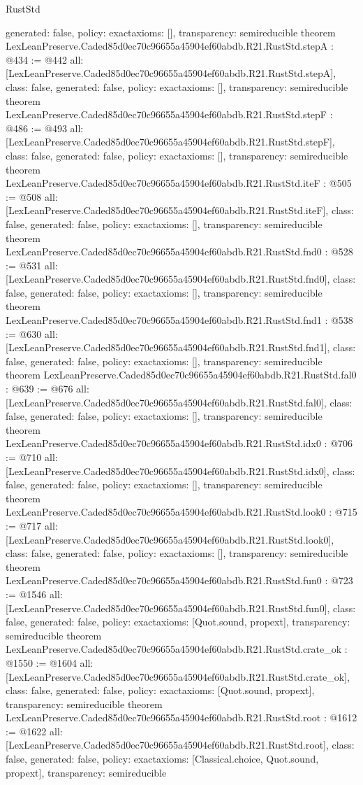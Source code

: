 \begin{lexlean}{RustStd}
\begin{coremodule}
{  generated: false,
  policy: exact{axioms: []},
  transparency: semireducible
}
theorem LexLeanPreserve.Caded85d0ec70c96655a45904ef60abdb.R21.RustStd.stepA : @434 := @442 {
  all: [LexLeanPreserve.Caded85d0ec70c96655a45904ef60abdb.R21.RustStd.stepA],
  class: false,
  generated: false,
  policy: exact{axioms: []},
  transparency: semireducible
}
theorem LexLeanPreserve.Caded85d0ec70c96655a45904ef60abdb.R21.RustStd.stepF : @486 := @493 {
  all: [LexLeanPreserve.Caded85d0ec70c96655a45904ef60abdb.R21.RustStd.stepF],
  class: false,
  generated: false,
  policy: exact{axioms: []},
  transparency: semireducible
}
theorem LexLeanPreserve.Caded85d0ec70c96655a45904ef60abdb.R21.RustStd.iteF : @505 := @508 {
  all: [LexLeanPreserve.Caded85d0ec70c96655a45904ef60abdb.R21.RustStd.iteF],
  class: false,
  generated: false,
  policy: exact{axioms: []},
  transparency: semireducible
}
theorem LexLeanPreserve.Caded85d0ec70c96655a45904ef60abdb.R21.RustStd.fnd0 : @528 := @531 {
  all: [LexLeanPreserve.Caded85d0ec70c96655a45904ef60abdb.R21.RustStd.fnd0],
  class: false,
  generated: false,
  policy: exact{axioms: []},
  transparency: semireducible
}
theorem LexLeanPreserve.Caded85d0ec70c96655a45904ef60abdb.R21.RustStd.fnd1 : @538 := @630 {
  all: [LexLeanPreserve.Caded85d0ec70c96655a45904ef60abdb.R21.RustStd.fnd1],
  class: false,
  generated: false,
  policy: exact{axioms: []},
  transparency: semireducible
}
theorem LexLeanPreserve.Caded85d0ec70c96655a45904ef60abdb.R21.RustStd.fal0 : @639 := @676 {
  all: [LexLeanPreserve.Caded85d0ec70c96655a45904ef60abdb.R21.RustStd.fal0],
  class: false,
  generated: false,
  policy: exact{axioms: []},
  transparency: semireducible
}
theorem LexLeanPreserve.Caded85d0ec70c96655a45904ef60abdb.R21.RustStd.idx0 : @706 := @710 {
  all: [LexLeanPreserve.Caded85d0ec70c96655a45904ef60abdb.R21.RustStd.idx0],
  class: false,
  generated: false,
  policy: exact{axioms: []},
  transparency: semireducible
}
theorem LexLeanPreserve.Caded85d0ec70c96655a45904ef60abdb.R21.RustStd.look0 : @715 := @717 {
  all: [LexLeanPreserve.Caded85d0ec70c96655a45904ef60abdb.R21.RustStd.look0],
  class: false,
  generated: false,
  policy: exact{axioms: []},
  transparency: semireducible
}
theorem LexLeanPreserve.Caded85d0ec70c96655a45904ef60abdb.R21.RustStd.fun0 : @723 := @1546 {
  all: [LexLeanPreserve.Caded85d0ec70c96655a45904ef60abdb.R21.RustStd.fun0],
  class: false,
  generated: false,
  policy: exact{axioms: [Quot.sound, propext]},
  transparency: semireducible
}
theorem LexLeanPreserve.Caded85d0ec70c96655a45904ef60abdb.R21.RustStd.crate_ok : @1550 := @1604 {
  all: [LexLeanPreserve.Caded85d0ec70c96655a45904ef60abdb.R21.RustStd.crate_ok],
  class: false,
  generated: false,
  policy: exact{axioms: [Quot.sound, propext]},
  transparency: semireducible
}
theorem LexLeanPreserve.Caded85d0ec70c96655a45904ef60abdb.R21.RustStd.root : @1612 := @1622 {
  all: [LexLeanPreserve.Caded85d0ec70c96655a45904ef60abdb.R21.RustStd.root],
  class: false,
  generated: false,
  policy: exact{axioms: [Classical.choice, Quot.sound, propext]},
  transparency: semireducible
}


\end{coremodule}
\end{lexlean}
